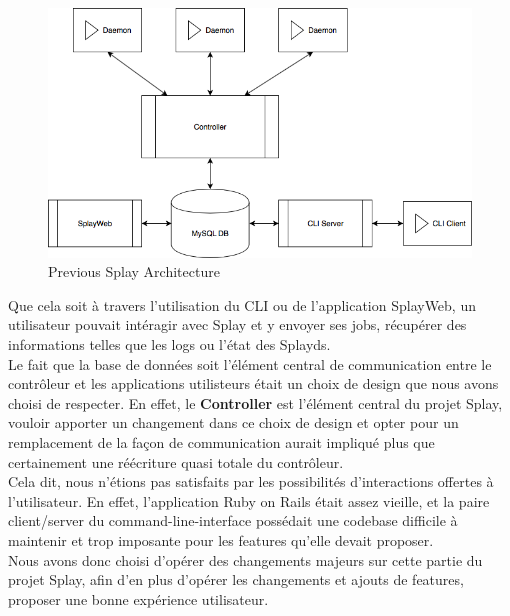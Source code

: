 \documentclass{eplmastersthesis}
\begin{document}
      \begin{figure}[H]
        \centering
        \includegraphics[scale=0.6]{figures/prev_arch.png}
        \caption{\label{prev_arch} Previous Splay Architecture}
      \end{figure}

      Que cela soit à travers l'utilisation du CLI ou de l'application SplayWeb,
      un utilisateur pouvait intéragir avec Splay et y envoyer ses jobs, récupérer
      des informations telles que les logs ou l'état des Splayds.\\

      Le fait que la base de données soit l'élément central de communication entre
      le contrôleur et les applications utilisteurs était un choix de design
      que nous avons choisi de respecter. En effet, le \textbf{Controller} est
      l'élément central du projet Splay, vouloir apporter un changement dans ce choix
      de design et opter pour un remplacement de la façon de communication aurait
      impliqué plus que certainement une réécriture quasi totale du contrôleur.\\

      Cela dit, nous n'étions pas satisfaits par les possibilités d'interactions
      offertes à l'utilisateur. En effet, l'application Ruby on Rails était assez
      vieille, et la paire client/server du command-line-interface possédait une
      codebase difficile à maintenir et trop imposante pour les features qu'elle
      devait proposer.\\

      Nous avons donc choisi d'opérer des changements majeurs sur cette partie
      du projet Splay, afin d'en plus d'opérer les changements et ajouts de features,
      proposer une bonne expérience utilisateur.
\end{document}
